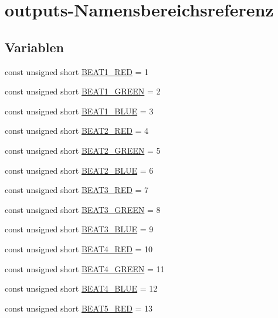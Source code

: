 \hypertarget{namespaceoutputs}{}\section{outputs-\/\+Namensbereichsreferenz}
\label{namespaceoutputs}
\subsection*{Variablen}
\begin{DoxyCompactItemize}
\item 
const unsigned short \hyperlink{namespaceoutputs_ae1c055268c6bbfadcc272bc6028b1a59}{B\+E\+A\+T1\+\_\+\+R\+ED} = 1
\item 
const unsigned short \hyperlink{namespaceoutputs_ad934b2db0cff1421ca84b300dc257508}{B\+E\+A\+T1\+\_\+\+G\+R\+E\+EN} = 2
\item 
const unsigned short \hyperlink{namespaceoutputs_a7c39d2e5116c2502c2b90bf1e8be5520}{B\+E\+A\+T1\+\_\+\+B\+L\+UE} = 3
\item 
const unsigned short \hyperlink{namespaceoutputs_a7b5646e7b81bc49443f10f2b852384bb}{B\+E\+A\+T2\+\_\+\+R\+ED} = 4
\item 
const unsigned short \hyperlink{namespaceoutputs_ad2dc5e7bf8fd1c9ffa64cf8efdb0035a}{B\+E\+A\+T2\+\_\+\+G\+R\+E\+EN} = 5
\item 
const unsigned short \hyperlink{namespaceoutputs_ac6bffee9716f79b218c8fb366351032e}{B\+E\+A\+T2\+\_\+\+B\+L\+UE} = 6
\item 
const unsigned short \hyperlink{namespaceoutputs_a0c48c063f394a0735f24036e932bff2b}{B\+E\+A\+T3\+\_\+\+R\+ED} = 7
\item 
const unsigned short \hyperlink{namespaceoutputs_a95e392d21973d605abcc9efc19dce314}{B\+E\+A\+T3\+\_\+\+G\+R\+E\+EN} = 8
\item 
const unsigned short \hyperlink{namespaceoutputs_ae87166c20e497c5b092a92bc98da94c2}{B\+E\+A\+T3\+\_\+\+B\+L\+UE} = 9
\item 
const unsigned short \hyperlink{namespaceoutputs_a73a38f1135a723ebb294500daa641aec}{B\+E\+A\+T4\+\_\+\+R\+ED} = 10
\item 
const unsigned short \hyperlink{namespaceoutputs_afd9270436632213bade739dbc4f6c8f6}{B\+E\+A\+T4\+\_\+\+G\+R\+E\+EN} = 11
\item 
const unsigned short \hyperlink{namespaceoutputs_aa66f074e1960dc7dbf507acdf6cc5ae3}{B\+E\+A\+T4\+\_\+\+B\+L\+UE} = 12
\item 
const unsigned short \hyperlink{namespaceoutputs_a992a202d7fce79a524fe71498efb3709}{B\+E\+A\+T5\+\_\+\+R\+ED} = 13

\end{DoxyCompactItemize}
